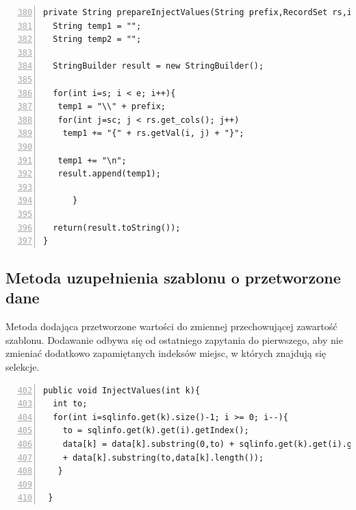 \begin{lstlisting}[numbers=left,firstnumber=380]
 private String prepareInjectValues(String prefix,RecordSet rs,int s, int e,int sc){
  String temp1 = "";
  String temp2 = "";

  StringBuilder result = new StringBuilder();

  for(int i=s; i < e; i++){
   temp1 = "\\" + prefix;
   for(int j=sc; j < rs.get_cols(); j++)
    temp1 += "{" + rs.getVal(i, j) + "}";

   temp1 += "\n";
   result.append(temp1);

      }

  return(result.toString());
}    
\end{lstlisting}


\subsection{Metoda uzupełnienia szablonu o przetworzone dane}

Metoda dodająca przetworzone wartości do zmiennej przechowującej zawartość szablonu. Dodawanie odbywa się od ostatniego zapytania do pierwszego, aby nie zmieniać dodatkowo zapamiętanych indeksów miejsc, w których znajdują się selekcje.

 \begin{lstlisting}[numbers=left,firstnumber=402]
 public void InjectValues(int k){
  int to;
  for(int i=sqlinfo.get(k).size()-1; i >= 0; i--){
    to = sqlinfo.get(k).get(i).getIndex();
    data[k] = data[k].substring(0,to) + sqlinfo.get(k).get(i).getData() 
    + data[k].substring(to,data[k].length());
   }
        
 }
\end{lstlisting}


